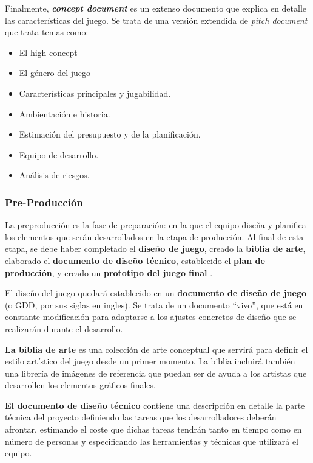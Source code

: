 Finalmente, \textbf{\textit{concept document}} es un extenso documento que explica en detalle las características del juego. Se trata de una versión extendida de \textit{pitch document} que trata temas como: 
\begin{itemize}
\item El high concept
\item El género del juego
\item Características principales y jugabilidad.
\item Ambientación e historia.
\item Estimación del presupuesto y de la planificación.
\item Equipo de desarrollo.
\item Análisis de riesgos.
\end{itemize}

\subsubsection{Pre-Producción}
La preproducción es la fase de preparación: en la que el equipo diseña y planifica los elementos que serán desarrollados en la etapa de producción. Al final de esta etapa, se debe haber completado el \textbf{diseño de juego}, creado la \textbf{biblia de arte}, elaborado el \textbf{documento de diseño técnico}, establecido el \textbf{plan de producción}, y creado un \textbf{prototipo del juego final} \cite{game_design_2}.

El diseño del juego quedará establecido en un \textbf{documento de diseño de juego} (o GDD, por sus siglas en ingles). Se trata de un documento ``vivo'', que está en constante modificación para adaptarse a los ajustes concretos de diseño que se realizarán durante el desarrollo.

\textbf{La biblia de arte} es una colección de arte conceptual que servirá para definir el estilo artístico del juego desde un primer momento. La biblia incluirá también una librería de imágenes de referencia que puedan ser de ayuda a los artistas que desarrollen los elementos gráficos finales.

\textbf{El documento de diseño técnico} contiene una descripción en detalle la parte técnica del proyecto definiendo las tareas que los desarrolladores deberán afrontar, estimando el coste que dichas tareas tendrán tanto en tiempo como en número de personas y especificando las herramientas y técnicas que utilizará el equipo.

